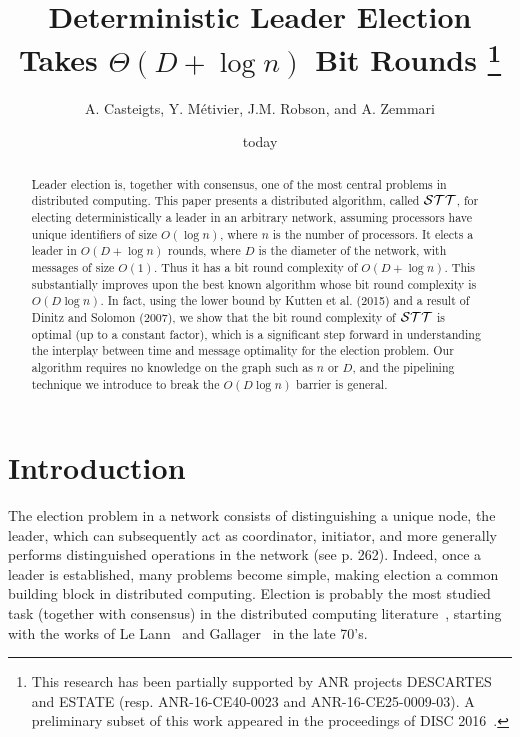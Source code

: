 \documentclass[11pt,envcountsame,letterpaper]{llncs}
\title{\large Deterministic Leader Election Takes $\Theta(D+\log n)$ Bit Rounds
\thanks{This research has been partially supported by ANR projects DESCARTES and ESTATE (resp. ANR-16-CE40-0023 and ANR-16-CE25-0009-03). A preliminary subset of this work 
appeared in the proceedings of DISC 2016~\cite{CMRZ16a}.
}
}
\author{A. Casteigts, Y. M\'etivier, J.M. Robson, and A. Zemmari}
\institute{Universit\'e de Bordeaux - Bordeaux INP
 LaBRI, UMR CNRS 5800\\ 351 cours de la
  Lib\'eration, 33405 Talence, France\\ 
\{acasteig, metivier, robson, zemmari\}@labri.fr }
\begin{document}
\newcommand{\STT}{\ensuremath{{\cal STT}}\xspace}

\maketitle 
\date{today}
\begin{abstract}
  Leader election is, together with consensus, one of the most central
  problems in distributed computing. This paper presents a distributed
  algorithm, called \STT, for electing deterministically a leader in
  an arbitrary network, assuming processors have unique identifiers of
  size $O(\log n)$, where $n$ is the number of processors. It elects a
  leader in $O(D +\log n)$ rounds, where $D$ is the diameter of the
  network, with messages of size $O(1)$. Thus it has a bit round
  complexity of $O(D +\log n)$. This substantially improves upon the
  best known algorithm whose bit round complexity is $O(D\log n)$. In
  fact, using the lower bound by Kutten et al. (2015) and a
  result of Dinitz and Solomon (2007), we show that the bit round
  complexity of \STT is optimal (up to a constant factor), which is a
  significant step forward in understanding the interplay between time
  and message optimality for the election problem. Our algorithm
  requires no knowledge on the graph such as $n$ or $D$, and the
  pipelining technique we introduce to break the $O(D\log n)$ barrier
  is general.
\end{abstract}
\section{Introduction}
\label{sec:introduction}
The election problem in a network consists of distinguishing a unique node, the leader, which
 can subsequently act as coordinator, initiator, 
and more generally performs distinguished operations in the network
 (see \cite{Tanenbaum} p. 262). 
Indeed, once a leader is established, many problems become simple, making election a common building
block
in distributed computing. Election is probably the most studied task (together with consensus) in the distributed computing literature~\cite{DMR08},
starting with the works of Le Lann~\cite{LeLann} and Gallager~\cite{Gallager} in the late 70's. 
\end{document}
